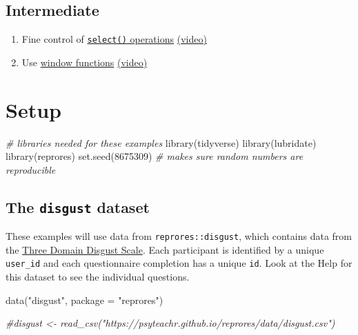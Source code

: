 \documentclass[
  oneside]{book}
\newenvironment{Shaded}{\begin{snugshade}}{\end{snugshade}}
\newcommand{\AttributeTok}[1]{\textcolor[rgb]{0.77,0.63,0.00}{#1}}
\newcommand{\CommentTok}[1]{\textcolor[rgb]{0.56,0.35,0.01}{\textit{#1}}}
\newcommand{\DecValTok}[1]{\textcolor[rgb]{0.00,0.00,0.81}{#1}}
\newcommand{\FunctionTok}[1]{\textcolor[rgb]{0.00,0.00,0.00}{#1}}
\newcommand{\NormalTok}[1]{#1}
\newcommand{\StringTok}[1]{\textcolor[rgb]{0.31,0.60,0.02}{#1}}
\providecommand{\tightlist}{%
  \setlength{\itemsep}{0pt}\setlength{\parskip}{0pt}}
\begin{document}
\hypertarget{intermediate-3}{%
\subsection*{Intermediate}\label{intermediate-3}}

\begin{enumerate}
\def\labelenumi{\arabic{enumi}.}
\setcounter{enumi}{3}
\tightlist
\item
  Fine control of \protect\hyperlink{select_helpers}{\texttt{select()} operations} \href{https://youtu.be/R1bi1QwF9t0}{(video)}
\item
  Use \protect\hyperlink{window}{window functions} \href{https://youtu.be/uo4b0W9mqPc}{(video)}
\end{enumerate}

\hypertarget{setup-dplyr}{%
\section{Setup}\label{setup-dplyr}}

\begin{Shaded}
\begin{Highlighting}[]
\CommentTok{\# libraries needed for these examples}
\FunctionTok{library}\NormalTok{(tidyverse)}
\FunctionTok{library}\NormalTok{(lubridate)}
\FunctionTok{library}\NormalTok{(reprores)}
\FunctionTok{set.seed}\NormalTok{(}\DecValTok{8675309}\NormalTok{) }\CommentTok{\# makes sure random numbers are reproducible}
\end{Highlighting}
\end{Shaded}

\hypertarget{data-disgust}{%
\subsection{\texorpdfstring{The \texttt{disgust} dataset}{The disgust dataset}}\label{data-disgust}}

These examples will use data from \texttt{reprores::disgust}, which contains data from the \href{http://digitalrepository.unm.edu/cgi/viewcontent.cgi?article=1139\&context=psy_etds}{Three Domain Disgust Scale}. Each participant is identified by a unique \texttt{user\_id} and each questionnaire completion has a unique \texttt{id}. Look at the Help for this dataset to see the individual questions.

\begin{Shaded}
\begin{Highlighting}[]
\FunctionTok{data}\NormalTok{(}\StringTok{"disgust"}\NormalTok{, }\AttributeTok{package =} \StringTok{"reprores"}\NormalTok{)}

\CommentTok{\#disgust \textless{}{-} read\_csv("https://psyteachr.github.io/reprores/data/disgust.csv")}
\end{Highlighting}
\end{Shaded}
\end{document}

